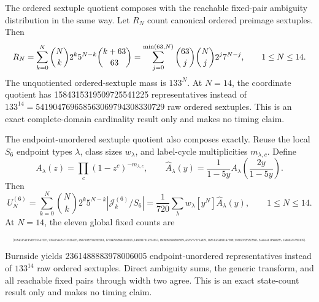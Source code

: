 \documentclass{article}
\newcommand{\fitmath}[1]{\resizebox{0.99\linewidth}{!}{$\displaystyle #1$}}
\begin{document}
The ordered sextuple quotient composes with the reachable fixed-pair ambiguity
distribution in the same way. Let $R_N$ count canonical ordered preimage
sextuples. Then
\begin{equation}
  \fitmath{%
    R_N
      =\sum_{k=0}^{N}\binom{N}{k}2^k5^{N-k}\binom{k+63}{63}
      =\sum_{j=0}^{\min(63,N)}
        \binom{63}{j}\binom{N}{j}2^j7^{N-j},
    \qquad 1\leq N\leq14.
  }
  \label{eq:optimization-crazy-global-ordered-preimage-sextuple-quotient}
\end{equation}
The unquotiented ordered-sextuple mass is $133^N$. At $N=14$, the coordinate
quotient has 1584315319509725541225 representatives instead of
$133^{14}=541904769658563069794308330729$ raw ordered sextuples. This is an
exact complete-domain cardinality result only and makes no timing claim.

The endpoint-unordered sextuple quotient also composes exactly. Reuse the local
$S_6$ endpoint types $\lambda$, class sizes $w_\lambda$, and label-cycle
multiplicities $m_{\lambda,c}$. Define
\[
  A_\lambda(z)=\prod_c(1-z^c)^{-m_{\lambda,c}},\qquad
  \widehat A_\lambda(y)=\frac{1}{1-5y}
    A_\lambda\!\left(\frac{2y}{1-5y}\right).
\]
Then
\begin{equation}
  U^{(6)}_N
    =\sum_{k=0}^{N}\binom{N}{k}2^k5^{N-k}
      \left|\mathcal{J}^{(6)}_k/S_6\right|
    =\frac{1}{720}\sum_\lambda w_\lambda
      [y^N]\widehat A_\lambda(y),
  \qquad 1\leq N\leq14.
  \label{eq:optimization-crazy-global-unordered-preimage-sextuple-quotient}
\end{equation}
At $N=14$, the eleven global fixed counts are
\begin{equation*}
  \fitmath{%
    (1584315319509725541225,7054158423775528425,38878022703262281,
    175942582684950825,1460917013254953,1806087636205929,43767572733825,
    18851333161147209,256827625272665,244844111940225,13080355599105).
  }
\end{equation*}
Burnside yields 2361488883978006005 endpoint-unordered representatives instead
of $133^{14}$ raw ordered sextuples. Direct ambiguity sums, the generic
transform, and all reachable fixed pairs through width two agree. This is an
exact state-count result only and makes no timing claim.
\end{document}
